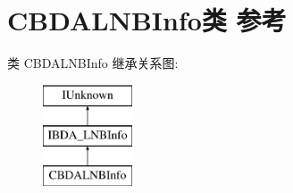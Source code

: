 \hypertarget{class_c_b_d_a_l_n_b_info}{}\section{C\+B\+D\+A\+L\+N\+B\+Info类 参考}
\label{class_c_b_d_a_l_n_b_info}
类 C\+B\+D\+A\+L\+N\+B\+Info 继承关系图\+:\begin{figure}[H]
\begin{center}
\leavevmode
\includegraphics[height=3.000000cm]{class_c_b_d_a_l_n_b_info}
\end{center}
\end{figure}
